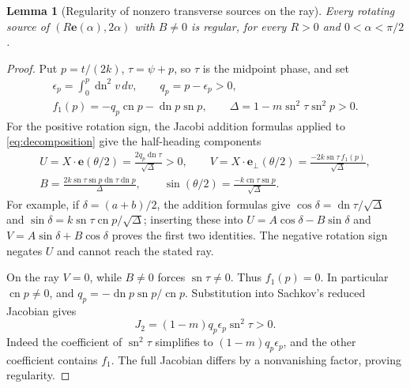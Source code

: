 \documentclass[11pt,a4paper]{article}
\newtheorem{lemma}[theorem]{Lemma}
\theoremstyle{remark}\newtheorem{remark}[theorem]{Remark}
\newcommand{\sn}{\operatorname{sn}}
\newcommand{\cn}{\operatorname{cn}}
\newcommand{\dn}{\operatorname{dn}}
\newcommand{\ee}{\mathbf e}
\newcommand{\ep}{\mathbf e_{\perp}}
\begin{document}
\begin{lemma}[Regularity of nonzero transverse sources on the ray]
\label{lem:ray-maxwell-regular}
Every rotating source of $(R\ee(\alpha),2\alpha)$ with $B\ne0$
is regular, for every $R>0$ and $0<\alpha<\pi/2$.
\end{lemma}
\begin{proof}
Put $p=t/(2k)$, $\tau=\psi+p$, so $\tau$ is the midpoint
phase, and set
\[
 \begin{gathered}
 \epsilon_p=\int_0^p\dn^2v\,dv,\qquad q_p=p-\epsilon_p>0,\\
 f_1(p)=-q_p\cn p-\dn p\sn p,\qquad
 \Delta=1-m\sn^2\tau\sn^2p>0.
 \end{gathered}
\]
For the positive rotation sign, the Jacobi addition formulas applied
to \eqref{eq:decomposition} give the half-heading components
\begin{equation}\label{eq:ray-maxwell-components}
 \begin{gathered}
 U=X\cdot\ee(\theta/2)=\frac{2q_p\dn\tau}{\sqrt\Delta}>0,
 \qquad
 V=X\cdot\ep(\theta/2)=\frac{-2k\sn\tau\,f_1(p)}{\sqrt\Delta},\\
 B=\frac{2k\sn\tau\sn p\dn\tau\dn p}{\Delta},
 \qquad
 \sin(\theta/2)=\frac{-k\cn\tau\sn p}{\sqrt\Delta}.
 \end{gathered}
\end{equation}
For example, if $\delta=(a+b)/2$, the addition formulas give
$\cos\delta=\dn\tau/\sqrt\Delta$ and
$\sin\delta=k\sn\tau\cn p/\sqrt\Delta$; inserting these into
$U=A\cos\delta-B\sin\delta$ and
$V=A\sin\delta+B\cos\delta$ proves the first two identities.
The negative rotation sign negates $U$ and cannot reach the stated ray.

On the ray $V=0$, while $B\ne0$ forces $\sn\tau\ne0$.
Thus $f_1(p)=0$. In particular $\cn p\ne0$, and
$q_p=-\dn p\sn p/\cn p$.
Substitution into Sachkov's reduced Jacobian
\cite[(2.10)--(2.14)]{SC} gives
\begin{equation}\label{eq:ray-maxwell-jacobian}
 J_2=(1-m)q_p\epsilon_p\sn^2\tau>0.
\end{equation}
Indeed the coefficient of $\sn^2\tau$ simplifies to
$(1-m)q_p\epsilon_p$, and the other coefficient contains $f_1$.
The full Jacobian differs by a nonvanishing factor, proving regularity.
\end{proof}
\end{document}
